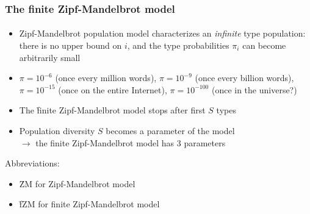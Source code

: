 \documentclass[handout,notes=show,t]{beamer} %
\begin{document}
\begin{frame}
  \frametitle{The finite Zipf-Mandelbrot model}
  \framesubtitle{\citet{Evert:04}}

  \begin{itemize}
  \item Zipf-Mandelbrot population model characterizes an \emph{infinite} type
    population: there is no upper bound on $i$, and the type probabilities
    $\pi_i$ can become arbitrarily small
  \item $\pi = 10^{-6}$ (once every million words), $\pi = 10^{-9}$ (once
    every billion words), $\pi = 10^{-15}$ (once on the entire Internet), $\pi
    = 10^{-100}$ (once in the universe?)
  \item<2-> The \h{finite Zipf-Mandelbrot} model stops after first $S$
    types
  \item<2-> Population diversity $S$ becomes a parameter of the model\\
    $\to$ the finite Zipf-Mandelbrot model has 3 parameters
  \end{itemize}

  Abbreviations: 
  \begin{itemize}
  \item \h{ZM} for Zipf-Mandelbrot model
  \item \h{fZM} for finite Zipf-Mandelbrot model
  \end{itemize}
\end{frame}
\end{document}
